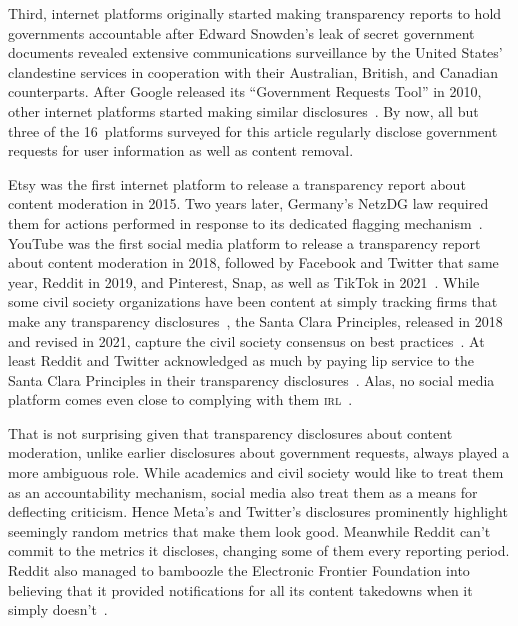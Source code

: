 \documentclass[nonacm,screen]{acmart}
\newcommand\V[1]{\textsc{\MakeLowercase{#1}}}
\begin{document}
Third, internet platforms originally started making transparency reports to hold
governments accountable after Edward Snowden's leak of secret government
documents revealed extensive communications surveillance by the United States'
clandestine services in cooperation with their Australian, British, and Canadian
counterparts. After Google released its ``Government Requests Tool'' in 2010,
other internet platforms started making similar
disclosures~\cite{TrustSafetyProfessionalAssociation2022}. By now, all but three
of the 16~platforms surveyed for this article regularly disclose government
requests for user information as well as content removal.

Etsy was the first internet platform to release a transparency report about
content moderation in 2015. Two years later, Germany's NetzDG law required them
for actions performed in response to its dedicated flagging
mechanism~\cite{TrustSafetyProfessionalAssociation2022}. YouTube was the first
social media platform to release a transparency report about content moderation
in 2018, followed by Facebook and Twitter that same year, Reddit in 2019, and
Pinterest, Snap, as well as TikTok in 2021~\cite{Binder2018,York2018}. While
some civil society organizations have been content at simply tracking firms that
make any transparency disclosures~\cite{AccessNow2021,StoughtonRosenzweig2022},
the Santa Clara Principles, released in 2018 and revised in 2021, capture the
civil society consensus on best
practices~\cite{AccessNowACLUFoundationOfNorthernCaliforniaea2021}. At least
Reddit and Twitter acknowledged as much by paying lip service to the Santa Clara
Principles in their transparency disclosures~\cite{Reddit2022,Twitter2022}.
Alas, no social media platform comes even close to complying with them
\V{IRL}~\cite{UrmanMakhortykh2023}.

That is not surprising given that transparency disclosures about content
moderation, unlike earlier disclosures about government requests, always played
a more ambiguous role. While academics and civil society would like to treat
them as an accountability mechanism, social media also treat them as a means for
deflecting criticism. Hence Meta's and Twitter's disclosures prominently
highlight seemingly random metrics that make them look good. Meanwhile Reddit
can't commit to the metrics it discloses, changing some of them every reporting
period. Reddit also managed to bamboozle the Electronic Frontier Foundation into
believing that it provided notifications for all its content takedowns when it
simply doesn't~\cite{CrockerGebhartea2019,Hawkins2023}.
\end{document}
